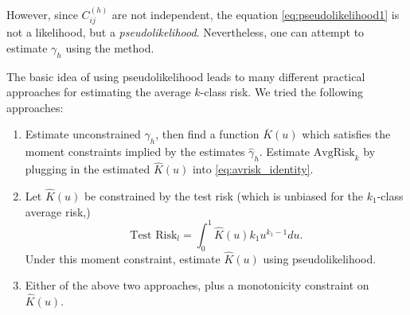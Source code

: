 \documentclass[12pt]{article}
\begin{document}
However, since $C_{ij}^{(h)}$ are not independent, the equation
\eqref{eq:pseudolikelihood1} is not a likelihood, but a
\emph{pseudolikelihood}.  Nevertheless, one can attempt to estimate
$\gamma_h$ using the method.

The basic idea of using pseudolikelihood leads to many different
practical approaches for estimating the average $k$-class risk.  We tried the following approaches:
\begin{enumerate}
\item Estimate unconstrained $\gamma_h$, then find a function
  $\bar{K}(u)$ which satisfies the moment constraints implied by the
  estimates $\hat{\gamma}_h$.  Estimate $\text{AvgRisk}_k$ by plugging
  in the estimated $\hat{K}(u)$ into \eqref{eq:avrisk_identity}.
\item Let $\hat{K}(u)$ be constrained by the test risk (which is unbiased for the $k_1$-class average risk,)
\[
\text{Test Risk}_l = \int_0^1 \hat{K}(u) k_1 u^{k_1 -1} du.
\]
Under this moment constraint, estimate $\hat{K}(u)$ using pseudolikelihood.
\item Either of the above two approaches, plus a monotonicity constraint on $\hat{K}(u).$
\end{enumerate}
\end{document}
